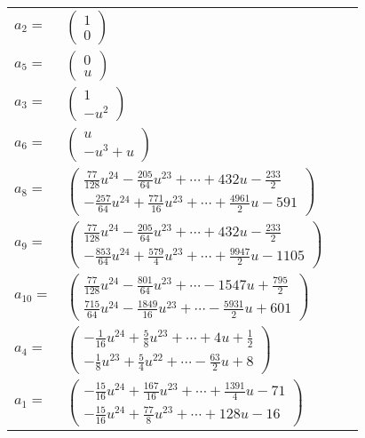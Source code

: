 \documentclass[1p]{elsarticle_modified}
\theoremstyle{definition}
\begin{document}
\begin{tabular}{m{7pt} m{180pt} m{7pt} m{180pt} }
\flushright $a_{2}=$&$\begin{pmatrix}1\\0\end{pmatrix}$ \\
\flushright $a_{5}=$&$\begin{pmatrix}0\\u\end{pmatrix}$ \\
\flushright $a_{3}=$&$\begin{pmatrix}1\\- u^2\end{pmatrix}$ \\
\flushright $a_{6}=$&$\begin{pmatrix}u\\- u^3+u\end{pmatrix}$ \\
\flushright $a_{8}=$&$\begin{pmatrix}\frac{77}{128} u^{24}-\frac{205}{64} u^{23}+\cdots+432 u-\frac{233}{2}\\-\frac{257}{64} u^{24}+\frac{771}{16} u^{23}+\cdots+\frac{4961}{2} u-591\end{pmatrix}$ \\
\flushright $a_{9}=$&$\begin{pmatrix}\frac{77}{128} u^{24}-\frac{205}{64} u^{23}+\cdots+432 u-\frac{233}{2}\\-\frac{853}{64} u^{24}+\frac{579}{4} u^{23}+\cdots+\frac{9947}{2} u-1105\end{pmatrix}$ \\
\flushright $a_{10}=$&$\begin{pmatrix}\frac{77}{128} u^{24}-\frac{801}{64} u^{23}+\cdots-1547 u+\frac{795}{2}\\\frac{715}{64} u^{24}-\frac{1849}{16} u^{23}+\cdots-\frac{5931}{2} u+601\end{pmatrix}$ \\
\flushright $a_{4}=$&$\begin{pmatrix}-\frac{1}{16} u^{24}+\frac{5}{8} u^{23}+\cdots+4 u+\frac{1}{2}\\-\frac{1}{8} u^{23}+\frac{5}{4} u^{22}+\cdots-\frac{63}{2} u+8\end{pmatrix}$ \\
\flushright $a_{1}=$&$\begin{pmatrix}-\frac{15}{16} u^{24}+\frac{167}{16} u^{23}+\cdots+\frac{1391}{4} u-71\\-\frac{15}{16} u^{24}+\frac{77}{8} u^{23}+\cdots+128 u-16\end{pmatrix}$ \\

\end{tabular}
\end{document}
